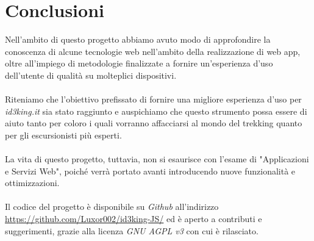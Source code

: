\documentclass[11pt]{report}
\begin{document}
\section{Conclusioni}
Nell'ambito di questo progetto abbiamo avuto modo di approfondire la conoscenza di alcune tecnologie web nell'ambito della realizzazione di web app, oltre all'impiego di metodologie finalizzate a fornire un'esperienza d'uso dell'utente di qualità su molteplici dispositivi.
\\\\Riteniamo che l'obiettivo prefissato di fornire una migliore esperienza d'uso per \textit{id3king.it} sia stato raggiunto e auspichiamo che questo strumento possa essere di aiuto tanto per coloro i quali vorranno affacciarsi al mondo del trekking quanto per gli escursionisti più esperti.
\\\\La vita di questo progetto, tuttavia, non si esaurisce con l'esame di "Applicazioni e Servizi Web", poiché verrà portato avanti introducendo nuove funzionalità e ottimizzazioni.
\\\\Il codice del progetto è disponibile su \textit{Github} all'indirizzo \url{https://github.com/Luxor002/id3king-JS/} ed è aperto a contributi e suggerimenti, grazie alla licenza \textit{GNU AGPL v3} con cui è rilasciato.
\end{document}
